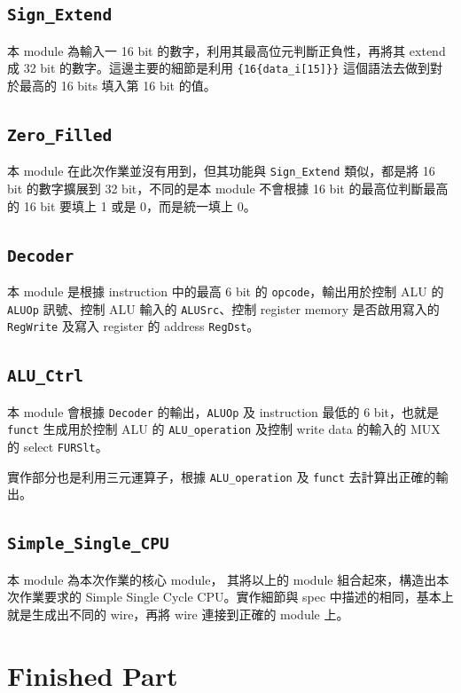 \documentclass[twocolumn]{extarticle}
\begin{document}
\subsection{\texttt{Sign\_Extend}}

本 module 為輸入一 16 bit 的數字，利用其最高位元判斷正負性，再將其 extend 成 32 bit 的數字。這邊主要的細節是利用 \texttt{\{16\{data\_i[15]\}\}} 這個語法去做到對於最高的 16 bits 填入第 16 bit 的值。

\subsection{\texttt{Zero\_Filled}}

本 module 在此次作業並沒有用到，但其功能與 \texttt{Sign\_Extend} 類似，都是將 16 bit 的數字擴展到 32 bit，不同的是本 module 不會根據 16 bit 的最高位判斷最高的 16 bit 要填上 1 或是 0，而是統一填上 0。


\subsection{\texttt{Decoder}}

本 module 是根據 instruction 中的最高 6 bit 的 \texttt{opcode}，輸出用於控制 ALU 的 \texttt{ALUOp} 訊號、控制 ALU 輸入的 \texttt{ALUSrc}、控制 register memory 是否啟用寫入的 \texttt{RegWrite} 及寫入 register 的 address \texttt{RegDst}。

\subsection{\texttt{ALU\_Ctrl}}

本 module 會根據 \texttt{Decoder} 的輸出，\texttt{ALUOp} 及 instruction 最低的 6 bit，也就是 \texttt{funct} 生成用於控制 ALU 的 \texttt{ALU\_operation} 及控制 write data 的輸入的 MUX 的 select \texttt{FURSlt}。

實作部分也是利用三元運算子，根據 \texttt{ALU\_operation} 及 \texttt{funct} 去計算出正確的輸出。

\subsection{\texttt{Simple\_Single\_CPU}}

本 module 為本次作業的核心 module， 其將以上的 module 組合起來，構造出本次作業要求的 Simple Single Cycle CPU。實作細節與 spec 中描述的相同，基本上就是生成出不同的 wire，再將 wire 連接到正確的 module 上。


\section{Finished Part}
\end{document}
